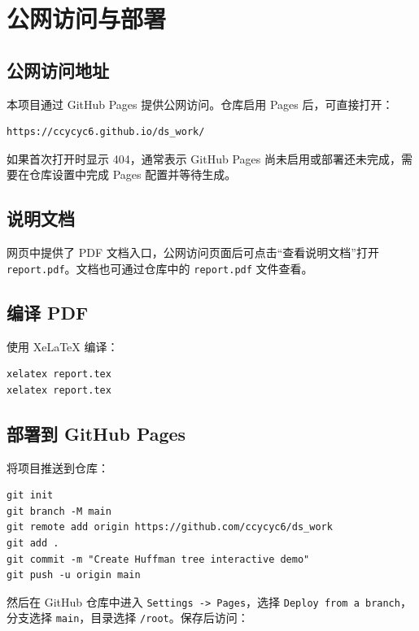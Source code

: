 \documentclass[UTF8,a4paper,12pt]{ctexart}
\begin{document}
\section{公网访问与部署}

\subsection{公网访问地址}

本项目通过 GitHub Pages 提供公网访问。仓库启用 Pages 后，可直接打开：

\begin{lstlisting}
https://ccycyc6.github.io/ds_work/
\end{lstlisting}

如果首次打开时显示 404，通常表示 GitHub Pages 尚未启用或部署还未完成，需要在仓库设置中完成 Pages 配置并等待生成。

\subsection{说明文档}

网页中提供了 PDF 文档入口，公网访问页面后可点击“查看说明文档”打开 \texttt{report.pdf}。文档也可通过仓库中的 \texttt{report.pdf} 文件查看。

\subsection{编译 PDF}

使用 XeLaTeX 编译：

\begin{lstlisting}
xelatex report.tex
xelatex report.tex
\end{lstlisting}

\subsection{部署到 GitHub Pages}

将项目推送到仓库：

\begin{lstlisting}
git init
git branch -M main
git remote add origin https://github.com/ccycyc6/ds_work
git add .
git commit -m "Create Huffman tree interactive demo"
git push -u origin main
\end{lstlisting}

然后在 GitHub 仓库中进入 \texttt{Settings -> Pages}，选择 \texttt{Deploy from a branch}，分支选择 \texttt{main}，目录选择 \texttt{/root}。保存后访问：
\end{document}
